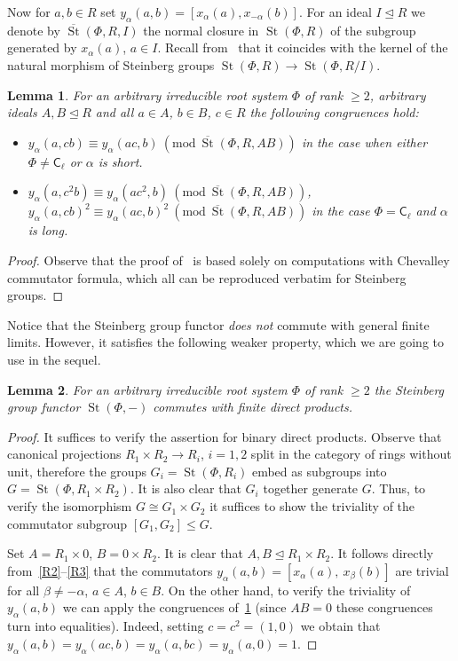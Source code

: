 \documentclass[oneside, 11pt]{amsart} \pdfoutput=1
\newcommand{\St}{\mathop{\mathrm{St}}\nolimits}
\numberwithin{equation}{section}
\newtheorem{lemma}{Lemma} \numberwithin{lemma}{section}
\theoremstyle{definition}
\newcommand{\rC}{\mathsf{C}}
\begin{document}
Now for $a, b \in R$ set $y_\alpha(a, b) = [x_\alpha(a), x_{-\alpha}(b)]$.
For an ideal $I \trianglelefteq R$ we denote by $\overline{\St}(\Phi, R, I)$ the normal closure in $\St(\Phi, R)$ of the subgroup generated by $x_\alpha(a)$, $a\in I$. Recall from~\cite[Lemma~5]{S15} that it coincides with the kernel of the natural morphism of Steinberg groups $\St(\Phi, R) \to \St(\Phi, R/I)$.

\begin{lemma} \label{lem:c-identities} For an arbitrary irreducible root system $\Phi$ of rank $\geq 2$, arbitrary ideals $A, B \trianglelefteq R$ and all $a \in A$, $b \in B$, $c \in R$ the following congruences hold:
\begin{itemize}
 \item $y_\alpha(a, cb) \equiv y_\alpha(ac, b)\ (\mathrm{mod}\ \overline{\St}(\Phi, R, AB))$ in the case when either $\Phi \neq \rC_{\ell}$ or $\alpha$ is short.
 \item $y_\alpha(a, c^2b) \equiv y_\alpha(ac^2, b)\ (\mathrm{mod}\ \overline{\St}(\Phi, R, AB))$, $y_\alpha(a, cb)^2 \equiv y_\alpha(ac, b)^2\ (\mathrm{mod}\ \overline{\St}(\Phi, R, AB))$ in the case $\Phi = \rC_{\ell}$ and $\alpha$ is long.
\end{itemize} \end{lemma}
\begin{proof}
 Observe that the proof of~\cite[Theorem~5]{VZ20} is based solely on computations with Chevalley commutator formula, which all can be reproduced verbatim for Steinberg groups.
\end{proof}

Notice that the Steinberg group functor {\it does not} commute with general finite limits. However, it satisfies the following weaker property, which we are going to use in the sequel.
\begin{lemma} \label{lem:fprod} For an arbitrary irreducible root system $\Phi$ of rank $\geq 2$ the Steinberg group functor $\St(\Phi, -)$ commutes with finite direct products. \end{lemma}
\begin{proof} 
It suffices to verify the assertion for binary direct products.
Observe that canonical projections $R_1 \times R_2 \to R_i$, $i=1,2$ split in the category of rings without unit, therefore the groups $G_i = \St(\Phi, R_i)$ embed as subgroups into $G = \St(\Phi, R_1 \times R_2)$. It is also clear that $G_i$ together generate $G$. Thus, to verify the isomorphism $G \cong G_1 \times G_2$ it suffices to show the triviality of the commutator subgroup $[G_1, G_2] \leq G$.

Set $A = R_1\times 0$, $B = 0 \times R_2$. It is clear that $A, B \trianglelefteq R_1 \times R_2$. 
It follows directly from~\eqref{R2}--\eqref{R3} that the commutators $y_\alpha(a, b) = [x_{\alpha}(a),\ x_\beta(b)]$ are trivial for all $\beta \neq -\alpha$, $a \in A$, $b\in B$. On the other hand, to verify the triviality of $y_\alpha(a, b)$ we can apply the congruences of~\cref{lem:c-identities} (since $AB=0$ these congruences turn into equalities).
Indeed, setting $c = c^2 = (1, 0)$ we obtain that $y_\alpha(a, b) = y_\alpha(ac, b) = y_\alpha(a, bc) = y_\alpha(a, 0) = 1$. \end{proof}
\end{document}
